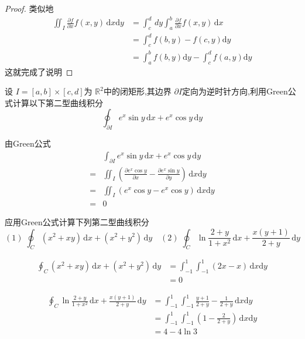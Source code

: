 \documentclass[lang=cn,12pt,color=green,fontset=none,thmcnt=section]{elegantbook}
\begin{document}
\begin{proof}
    类似地 $$
  \begin{aligned}
    \iint_{I}\frac{\partial f}{\partial x}f\left( x,y \right) \, \mathrm{d}x \mathrm{d}y & = \int_{c}^{d  } \,dy \int_{a}^{b} \frac{\partial f}{\partial x}f\left( x, y \right)  \, \mathrm{d}x \\
    & = \int_{c}^{d}f\left( b,y \right) -f\left( c,y \right)  \mathrm{d} y
  \\  & = \int_{a}^{b}f\left( b,y \right) \mathrm{d}y -\int_{c}^{d} f\left( a,y \right) \mathrm{d} y
  \end{aligned}
    $$这就完成了说明
\end{proof}

\begin{exercise}
    设 $I   =\left[ a,b \right] \times \left[  c,d \right]  $为 $\mathbb{R}^{2}     $中的闭矩形,其边界 $\partial I $定向为逆时针方向,利用Green公式计算以下第二型曲线积分 $$
    \oint_{\partial I   } e^{x}\sin y \,\mathrm{d}x    +  e^{x}\cos y \,\mathrm{d}y
    $$
    
\end{exercise}

\begin{solution}
    由Green公式
     $$
    \begin{aligned}
     &   \int_{\partial I } e^{x} \sin y \,\mathrm{d} x+ e^{x}\cos y \, \mathrm{d} y  
      \\ = & \iint_{I} \left( \frac{\partial e^{x}\cos   y}{\partial x} -\frac{\partial e^{x}\sin   y}{\partial y}  \right) \,\mathrm{d}x \mathrm{d}y
      \\ = & \iint_{I} \left( e^{x}\cos   y - e^{x} \cos y \right)  \,\mathrm{d}x \mathrm{d}y
    \\ = & 0     \end{aligned}  
      $$
\end{solution}


\begin{exercise}
    应用Green公式计算下列第二型曲线积分
   $$\left( 1 \right) \; \oint_{C} \left( x^{2}+ xy   \right)\,\mathrm{d}x+  \left( x^{2}+ y^{2} \right)\,\mathrm{d}y 
   \quad \left( 2 \right) \; \oint_{C} \ln  \frac{2+ y}{1+ x^{2}}\,\mathrm{d}x+ \frac{x\left( y+ 1       \right) }{2+ y} \,\mathrm{d}y $$

   $$
    \begin{aligned}
    \oint_{C} \left( x^{2}+ xy   \right)\,\mathrm{d}x+  \left( x^{2}+ y^{2} \right)\,\mathrm{d}y  & =    \int_{-1}^{1}\int_{-1}^{1} \left( 2x- x \right)\,\mathrm{d}x \mathrm{d}y   
    \\ & = 0
\end{aligned}
   $$

   $$
\begin{aligned}
    \oint_{C} \ln \frac{2+ y}{1+ x^{2}}\,\mathrm{d}x +  \frac{x\left( y+ 1 \right)  }{2+ y } \,\mathrm{d}y    
    & =  \int_{-1}^{1}\int_{-1}^{1} \frac{y+ 1    }{2+ y  } -   \frac{1}{2+ y} \,\mathrm{d}x \mathrm{d}y
    \\ & =  \int_{-1}^{1}\int_{-1}^{1}\left( 1- \frac{2}{2+ y} \right)  \,\mathrm{d}x \mathrm{d}y 
    \\ & = 4-4 \ln 3
\end{aligned}
   $$
\end{exercise}
\end{document}
